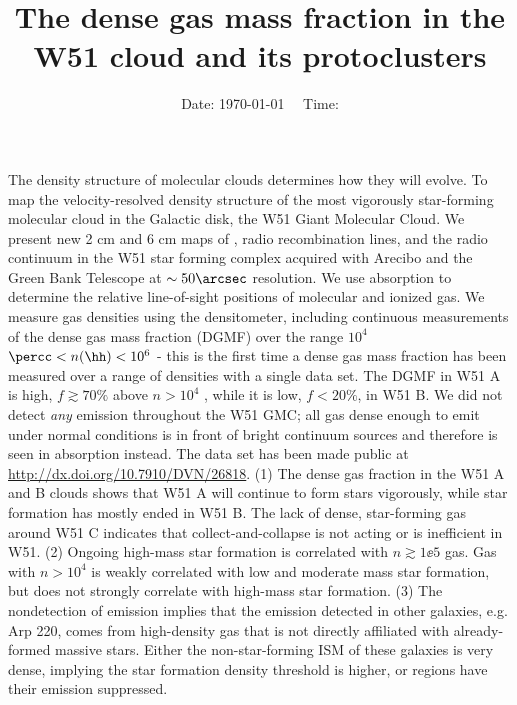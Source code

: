 



\title{The dense gas mass fraction in the W51 cloud and its protoclusters}



\date{Date: \today ~~ Time: \currenttime}



\abstract
{The density structure of molecular clouds determines how they will evolve.}
{To map the velocity-resolved density structure of the most vigorously
star-forming molecular cloud in the Galactic disk, the W51 Giant Molecular
Cloud.}
{
We present new 2 cm and 6 cm maps of \formaldehyde, radio recombination lines,
and the radio continuum in the W51 star forming complex acquired with Arecibo
and the Green Bank Telescope at $\sim50\arcsec$ resolution.
We use \formaldehyde absorption to determine the relative line-of-sight
positions of molecular and ionized gas.  We measure gas densities using the
\formaldehyde densitometer, including continuous measurements of the dense gas
mass
fraction (DGMF) over the range $10^4$ $\percc< n(\hh) < 10^6$ \percc - this is
the first time a dense gas mass fraction has been measured over a range
of densities with a single data set.}
{The DGMF in W51 A is high, $f\gtrsim70\%$ above $n>10^4$
\percc, while it is low, $f<20\%$, in W51 B.
We did not detect \emph{any} \formaldehyde emission throughout the W51 GMC; all
gas dense enough to emit under normal conditions is in front of bright
continuum sources and therefore is seen in absorption instead.  
The data set has been made public at \protect\url{http://dx.doi.org/10.7910/DVN/26818}.
}
{(1) The dense gas fraction in the W51 A and B clouds shows that W51 A will
continue to form stars vigorously, while star formation has mostly ended in W51
B.  The lack of dense, star-forming gas around W51 C indicates that
collect-and-collapse is not acting or is inefficient in W51.
(2) Ongoing high-mass star formation is correlated with $n\gtrsim1\ee{5}$
\percc gas.  Gas with $n>10^4$ \percc is weakly correlated with low and
moderate mass star formation, but does not strongly correlate with high-mass
star formation.
(3) The nondetection of \formaldehyde emission implies that the  emission
detected in other galaxies, e.g. Arp 220, comes from high-density gas that is
not directly affiliated with already-formed massive stars.  Either the
non-star-forming ISM of these galaxies is very dense, implying
the star formation density threshold is higher, or \hii regions have
their emission suppressed.
}


